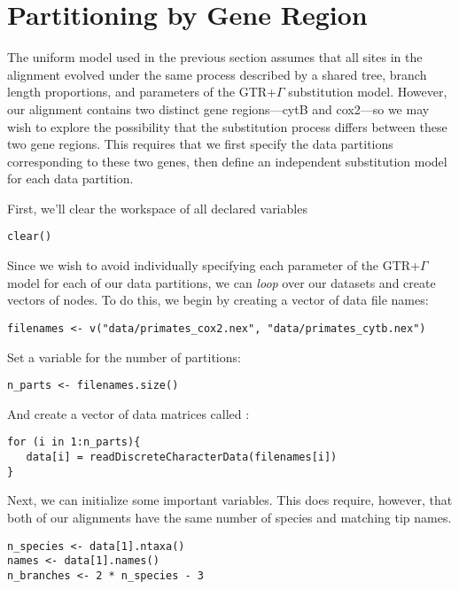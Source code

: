 \section{Partitioning by Gene Region}\label{secByGene}

The uniform model used in the previous section assumes that all sites in the alignment evolved under the same process described by a shared tree, branch length proportions, and parameters of the GTR+$\Gamma$ substitution model.
However, our alignment contains two distinct gene regions---cytB and cox2---so we may wish to explore the possibility that the substitution process differs between these two gene regions.
This requires that we first specify the data partitions corresponding to these two genes, then define an independent substitution model for each data partition. 

First, we'll clear the workspace of all declared variables
{\tt \begin{snugshade*}
\begin{lstlisting}
clear()
\end{lstlisting}
\end{snugshade*}}

Since we wish to avoid individually specifying each parameter of the GTR+$\Gamma$ model for each of our data partitions, we can \textit{loop} over our datasets and create vectors of nodes.
To do this, we begin by creating a vector of data file names:
{\tt \begin{snugshade*}
\begin{lstlisting}
filenames <- v("data/primates_cox2.nex", "data/primates_cytb.nex")
\end{lstlisting}
\end{snugshade*}}

Set a variable for the number of partitions:
{\tt \begin{snugshade*}
\begin{lstlisting}
n_parts <- filenames.size()
\end{lstlisting}
\end{snugshade*}}

And create a vector of data matrices called :
{\tt \begin{snugshade*}
\begin{lstlisting}
for (i in 1:n_parts){
   data[i] = readDiscreteCharacterData(filenames[i])
}
\end{lstlisting}
\end{snugshade*}}

Next, we can initialize some important variables. This does require, however, that both of our alignments have the same number of species and matching tip names.
{\tt \begin{snugshade*}
\begin{lstlisting}
n_species <- data[1].ntaxa()
names <- data[1].names()
n_branches <- 2 * n_species - 3
\end{lstlisting}
\end{snugshade*}}

